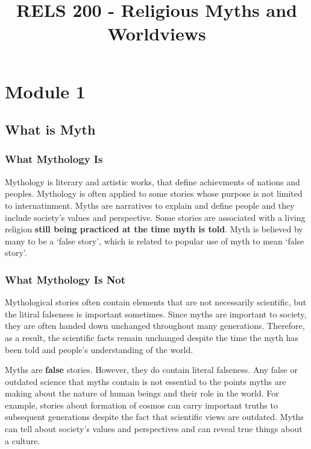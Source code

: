 \documentclass{article}
\title{RELS 200 - Religious Myths and Worldviews}
\begin{document}
\maketitle
\tableofcontents
\newpage


\section{Module 1}

\subsection{What is Myth}

\subsubsection{What Mythology Is}

Mythology is literary and artistic works, that define achievments of nations and peoples. Mythology is often applied to some stories whose purpose is not limited to internatinment. Myths are narratives to explain and define people and they include society's values and perspective. Some stories are associated with a living religion \textbf{still being practiced at the time myth is told}. Myth is believed by many to be a `false story', which is related to popular use of myth to mean `false story'.

\subsubsection{What Mythology Is Not}

Mythological stories often contain elements that are not necessarily scientific, but the litiral falseness is important sometimes. Since myths are important to society, they are often handed down unchanged throughout many generations. Therefore, as a result, the scientific facts remain unchanged despite the time the myth has been told and people's understanding of the world.

Myths are \textbf{false} stories. However, they do contain literal falseness. Any false or outdated science that myths contain is not essential to the points myths are making about the nature of human beings and their role in the world. For example, stories about formation of cosmos can carry important truths to subsequent generations despite the fact that scientific views are outdated. Myths can tell about society's values and perspectives and can reveal true things about a culture.
\end{document}
